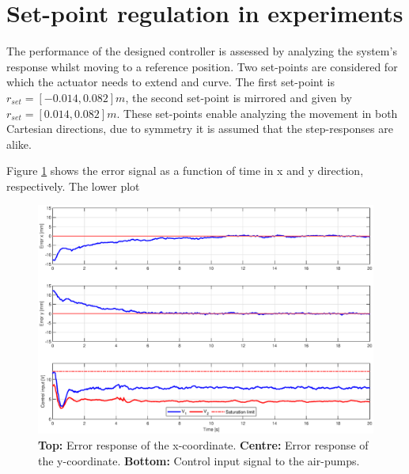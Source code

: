 \section{Set-point regulation in experiments}


The performance of the designed controller is assessed by analyzing the system's response whilst moving to a reference position. Two set-points are considered for which the actuator needs to extend and curve. The first set-point is $r_{set} = [-0.014,0.082] m$, the second set-point is mirrored and given by $r_{set} = [0.014,0.082] m$. These set-points enable analyzing the movement in both Cartesian directions, due to symmetry it is assumed that the step-responses are alike.


Figure \ref{fig5:stepleft} shows the error signal as a function of time in x and y direction, respectively. The lower plot 







\newpage
\begin{figure}[H]
    \centering
    \includegraphics[width = \textwidth]{Figures/Chapter5/errorsignalleftwide.eps}
    \caption{\textbf{Top:} Error response of the x-coordinate. \textbf{Centre:} Error response of the y-coordinate. \textbf{Bottom:} Control input signal to the air-pumps.}
    \label{fig5:stepleft}
\end{figure}

